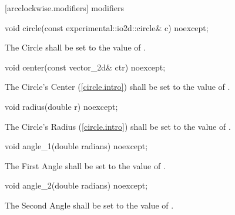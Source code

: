  [arcclockwise.modifiers]{ modifiers}

\begin{itemdecl}
void circle(const experimental::io2d::circle& c) noexcept;
\end{itemdecl}
\begin{itemdescr}
\pnum
\effects
The Circle shall be set to the value of .
\end{itemdescr}

\begin{itemdecl}
void center(const vector_2d& ctr) noexcept;
\end{itemdecl}
\begin{itemdescr}
\pnum
\effects
The Circle's Center (\ref{circle.intro}) shall be set to the value of .
\end{itemdescr}

\begin{itemdecl}
void radius(double r) noexcept;
\end{itemdecl}
\begin{itemdescr}
\pnum
\effects
The Circle's Radius (\ref{circle.intro}) shall be set to the value of .
\end{itemdescr}

\begin{itemdecl}
void angle_1(double radians) noexcept;
\end{itemdecl}
\begin{itemdescr}
\pnum
\effects
The First Angle shall be set to the value of .
\end{itemdescr}

\begin{itemdecl}
void angle_2(double radians) noexcept;
\end{itemdecl}
\begin{itemdescr}
\pnum
\effects
The Second Angle shall be set to the value of .
\end{itemdescr}


